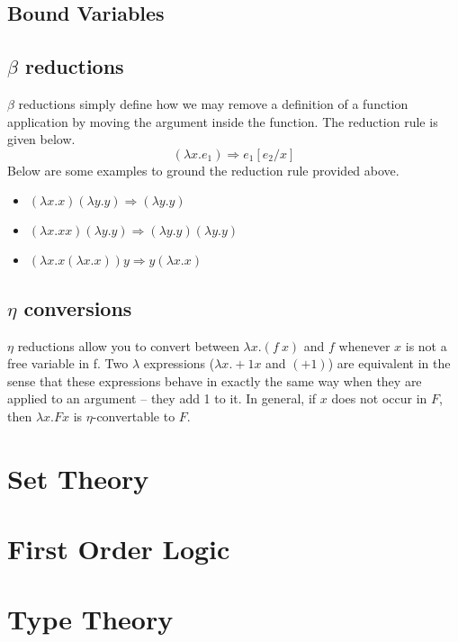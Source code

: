 \documentclass[a4paper,11pt]{article}
\begin{document}
\subsection{Bound Variables}

\subsection{$\beta$ reductions}
$\beta$ reductions simply define how we may remove a definition of a function application by moving the argument inside the function. The reduction rule is given below. 
$$
(\lambda x . e_1) \Rightarrow e_1[e_2/x]
$$
Below are some examples to ground the reduction rule provided above. 
\begin{itemize}
  \item $(\lambda x . x) (\lambda y . y) \Rightarrow (\lambda y . y)$
  \item $(\lambda x . x x) (\lambda y . y) \Rightarrow (\lambda y . y) (\lambda y . y)$
  \item $(\lambda x . x (\lambda x . x)) y \Rightarrow y (\lambda x . x )$
\end{itemize}

\subsection{$\eta$ conversions}
$\eta$ reductions allow you to convert between $\lambda x . (f \ x)$ and $f$ whenever $x$ is not a free variable 
in f. Two $\lambda$ expressions ($\lambda x . + 1 x$ and $(+ 1)$) are equivalent in the sense that these expressions behave in exactly the same way 
when they are applied to an argument -- they add 1 to it. In general, if $x$ does not occur in $F$, then $\lambda x . F x$ is $\eta$-convertable to $F$.

\section{Set Theory}

\section{First Order Logic}

\section{Type Theory}
\end{document}

